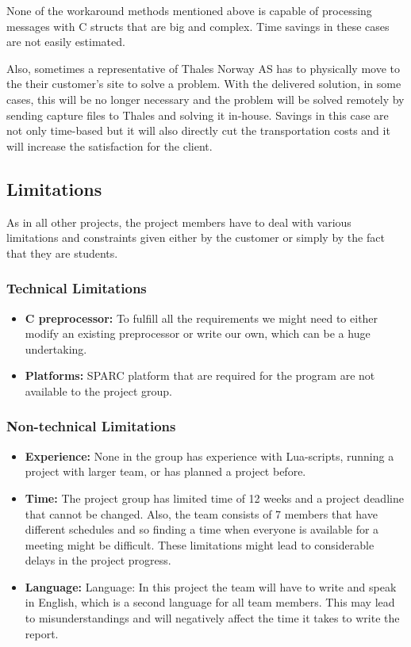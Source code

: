 None of the workaround methods mentioned above is capable of processing messages with C structs that are big and complex. Time savings in these cases are not easily estimated.

Also, sometimes a representative of Thales Norway AS has to physically move to the their customer’s site to solve a problem. With the delivered solution, in some cases, this will be no longer necessary and the problem will be solved remotely by sending capture files to Thales and solving it in-house. Savings in this case are not only time-based but it will also directly cut the transportation costs and it will increase the satisfaction for the client.

\subsection{Limitations}
As in all other projects, the project members have to deal with various limitations and constraints given either by the customer or simply by the fact that they are students.

\subsubsection{Technical Limitations}
\begin{itemize}
	\item \textbf{C preprocessor:} To fulfill all the requirements we might need to either modify an existing preprocessor or write our own, which can be a huge undertaking.
	\item \textbf{Platforms:} SPARC platform that are required for the program are not available to the project group. 
\end{itemize}

\subsubsection{Non-technical Limitations}
\begin{itemize}
	\item \textbf{Experience:} None in the group has experience with Lua-scripts, running a project with larger team, or has planned a project before.
	\item \textbf{Time:} The project group has limited time of 12 weeks and a project deadline that cannot be changed. Also, the team consists of 7 members that have different schedules and so finding a time when everyone is available for a meeting might be difficult. These limitations might lead to considerable delays in the project progress.
	\item \textbf{Language:}         Language: In this project the team will have to write and speak in English, which is a second language for all team members. This may lead to misunderstandings and will negatively affect the time it takes to write the report.
\end{itemize}

